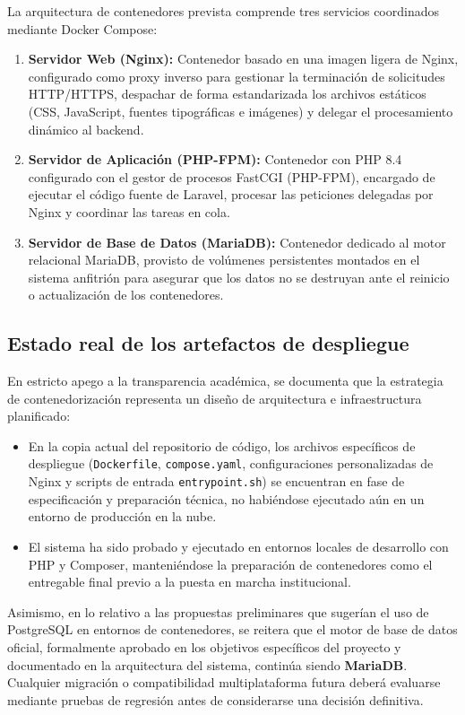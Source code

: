 La arquitectura de contenedores prevista comprende tres servicios coordinados mediante Docker Compose:
\begin{enumerate}
    \item \textbf{Servidor Web (Nginx):} Contenedor basado en una imagen ligera de Nginx, configurado como proxy inverso para gestionar la terminación de solicitudes HTTP/HTTPS, despachar de forma estandarizada los archivos estáticos (CSS, JavaScript, fuentes tipográficas e imágenes) y delegar el procesamiento dinámico al backend.
    \item \textbf{Servidor de Aplicación (PHP-FPM):} Contenedor con PHP 8.4 configurado con el gestor de procesos FastCGI (PHP-FPM), encargado de ejecutar el código fuente de Laravel, procesar las peticiones delegadas por Nginx y coordinar las tareas en cola.
    \item \textbf{Servidor de Base de Datos (MariaDB):} Contenedor dedicado al motor relacional MariaDB, provisto de volúmenes persistentes montados en el sistema anfitrión para asegurar que los datos no se destruyan ante el reinicio o actualización de los contenedores.
\end{enumerate}

\subsection{Estado real de los artefactos de despliegue}
\label{sec:estado_despliegue}

En estricto apego a la transparencia académica, se documenta que la estrategia de contenedorización representa un diseño de arquitectura e infraestructura planificado:
\begin{itemize}
    \item En la copia actual del repositorio de código, los archivos específicos de despliegue (\texttt{Dockerfile}, \texttt{compose.yaml}, configuraciones personalizadas de Nginx y scripts de entrada \texttt{entrypoint.sh}) se encuentran en fase de especificación y preparación técnica, no habiéndose ejecutado aún en un entorno de producción en la nube.
    \item El sistema ha sido probado y ejecutado en entornos locales de desarrollo con PHP y Composer, manteniéndose la preparación de contenedores como el entregable final previo a la puesta en marcha institucional.
\end{itemize}

Asimismo, en lo relativo a las propuestas preliminares que sugerían el uso de PostgreSQL en entornos de contenedores, se reitera que el motor de base de datos oficial, formalmente aprobado en los objetivos específicos del proyecto y documentado en la arquitectura del sistema, continúa siendo \textbf{MariaDB}. Cualquier migración o compatibilidad multiplataforma futura deberá evaluarse mediante pruebas de regresión antes de considerarse una decisión definitiva.
